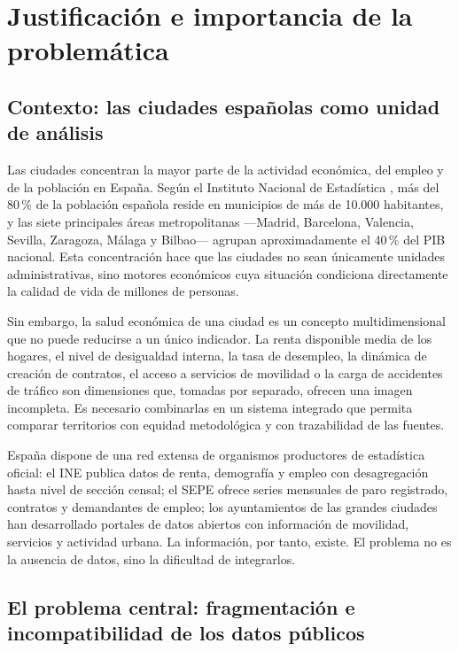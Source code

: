 \chapter{Justificación e importancia de la problemática}
\label{ch:justificacion}

\section{Contexto: las ciudades españolas como unidad de análisis}

Las ciudades concentran la mayor parte de la actividad económica, del empleo y de la población en España. Según el Instituto Nacional de Estadística \parencite{INE2023Padron}, más del 80\,\% de la población española reside en municipios de más de 10.000 habitantes, y las siete principales áreas metropolitanas —Madrid, Barcelona, Valencia, Sevilla, Zaragoza, Málaga y Bilbao— agrupan aproximadamente el 40\,\% del PIB nacional. Esta concentración hace que las ciudades no sean únicamente unidades administrativas, sino motores económicos cuya situación condiciona directamente la calidad de vida de millones de personas.

Sin embargo, la salud económica de una ciudad es un concepto multidimensional que no puede reducirse a un único indicador. La renta disponible media de los hogares, el nivel de desigualdad interna, la tasa de desempleo, la dinámica de creación de contratos, el acceso a servicios de movilidad o la carga de accidentes de tráfico son dimensiones que, tomadas por separado, ofrecen una imagen incompleta. Es necesario combinarlas en un sistema integrado que permita comparar territorios con equidad metodológica y con trazabilidad de las fuentes.

España dispone de una red extensa de organismos productores de estadística oficial: el INE publica datos de renta, demografía y empleo con desagregación hasta nivel de sección censal; el SEPE ofrece series mensuales de paro registrado, contratos y demandantes de empleo; los ayuntamientos de las grandes ciudades han desarrollado portales de datos abiertos con información de movilidad, servicios y actividad urbana. La información, por tanto, existe. El problema no es la ausencia de datos, sino la dificultad de integrarlos.

\section{El problema central: fragmentación e incompatibilidad de los datos públicos}

